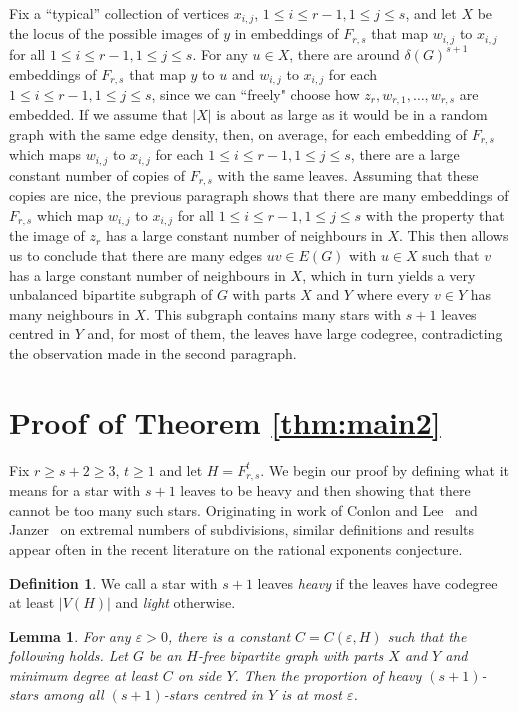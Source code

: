 \documentclass[11pt]{article}
\numberwithin{equation}{section}
\newtheorem{lemma}[theorem]{\bf Lemma}
\theoremstyle{definition}
\newtheorem{definition}[theorem]{\bf Definition}
\def\eps{\varepsilon}
\begin{document}
Fix a ``typical'' collection of vertices $x_{i,j}$, $1\leq i\leq r-1,1\leq j\leq s$, and let $X$ be the locus of the possible images of $y$ in embeddings of $F_{r,s}$ that map $w_{i,j}$ to $x_{i,j}$ for all $1\leq i\leq r-1,1\leq j\leq s$. For any $u\in X$, there are around $\delta(G)^{s+1}$ embeddings of $F_{r,s}$ that map $y$ to $u$ and $w_{i,j}$ to $x_{i,j}$ for each $1\leq i\leq r-1,1\leq j\leq s$, since we can ``freely" choose how $z_r,w_{r,1},\dots,w_{r,s}$ are embedded. If we assume that $|X|$ is about as large as it would be in a random graph with the same edge density, then, on average, for each embedding of $F_{r,s}$ which maps $w_{i,j}$ to $x_{i,j}$ for each $1\leq i\leq r-1,1\leq j\leq s$, there are a large constant number of copies of $F_{r,s}$ with the same leaves. Assuming that these copies are nice, the previous paragraph shows that there are many embeddings of $F_{r,s}$ which map $w_{i,j}$ to $x_{i,j}$ for all $1\leq i\leq r-1,1\leq j\leq s$ with the property that the image of $z_r$ has a large constant number of neighbours in $X$. This then allows us to conclude that there are many edges $uv\in E(G)$ with $u\in X$ such that $v$ has a large constant number of neighbours in $X$, which in turn yields a very unbalanced bipartite subgraph of $G$ with parts $X$ and $Y$ where every $v\in Y$ has many neighbours in $X$. This subgraph contains many stars with $s+1$ leaves centred in $Y$ and, for most of them, the leaves have large codegree, contradicting the observation made in the second paragraph.


\section{Proof of Theorem \ref{thm:main2}}

Fix $r\geq s+2\geq 3$, $t\geq 1$ and let $H=F_{r,s}^t$. We begin  our proof by defining what it means for a star with $s+1$ leaves to be heavy and then showing that there cannot be too many such stars. Originating in work of Conlon and Lee~\cite{CL21} and Janzer~\cite{Jan19} on extremal numbers of subdivisions, similar definitions and results appear often in the recent literature on the rational exponents conjecture.

\begin{definition}
	We call a star with $s+1$ leaves \emph{heavy} if the leaves have codegree at least $|V(H)|$ and \emph{light} otherwise.
\end{definition}

\begin{lemma} \label{lem:heavy stars}
	For any $\eps>0$, there is a constant $C=C(\eps,H)$ such that the following holds. Let $G$ be an $H$-free bipartite graph with parts $X$ and $Y$ and minimum degree at least $C$ on side $Y$. Then the proportion of heavy $(s+1)$-stars among all $(s+1)$-stars centred in $Y$ is at most $\eps$.
\end{lemma}
\end{document}
